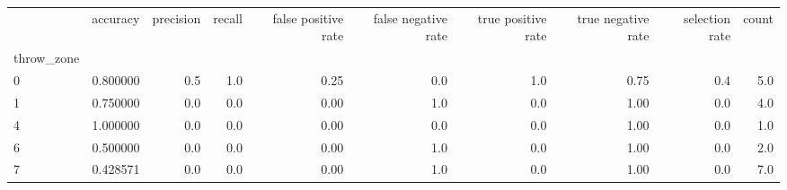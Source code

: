 \begin{tabular}{lrrrrrrrrr}
\toprule
{} &  accuracy &  precision &  recall &  false positive rate &  false negative rate &  true positive rate &  true negative rate &  selection rate &  count \\
throw\_zone &           &            &         &                      &                      &                     &                     &                 &        \\
\midrule
0          &  0.800000 &        0.5 &     1.0 &                 0.25 &                  0.0 &                 1.0 &                0.75 &             0.4 &    5.0 \\
1          &  0.750000 &        0.0 &     0.0 &                 0.00 &                  1.0 &                 0.0 &                1.00 &             0.0 &    4.0 \\
4          &  1.000000 &        0.0 &     0.0 &                 0.00 &                  0.0 &                 0.0 &                1.00 &             0.0 &    1.0 \\
6          &  0.500000 &        0.0 &     0.0 &                 0.00 &                  1.0 &                 0.0 &                1.00 &             0.0 &    2.0 \\
7          &  0.428571 &        0.0 &     0.0 &                 0.00 &                  1.0 &                 0.0 &                1.00 &             0.0 &    7.0 \\
\bottomrule
\end{tabular}
